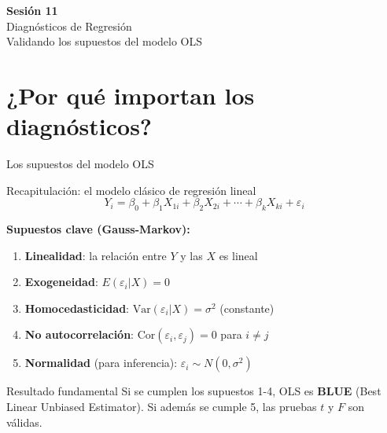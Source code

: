 \documentclass[aspectratio=169, 11pt]{beamer}
\begin{document}
\begin{frame}{}
\vfill
\centering
{\Large\textbf{Sesi\'on 11}}\\[1em]
{\normalsize Diagn\'osticos de Regresi\'on}\\[0.5em]
{\small Validando los supuestos del modelo OLS}
\vfill
\end{frame}

\section{¿Por qué importan los diagnósticos?}

\begin{frame}{Los supuestos del modelo OLS}
\begin{block}{Recapitulación: el modelo clásico de regresión lineal}
$$Y_i = \beta_0 + \beta_1 X_{1i} + \beta_2 X_{2i} + \cdots + \beta_k X_{ki} + \varepsilon_i$$
\end{block}

\textbf{Supuestos clave (Gauss-Markov):}
\begin{enumerate}
\item \textbf{Linealidad}: la relación entre $Y$ y las $X$ es lineal
\item \textbf{Exogeneidad}: $E(\varepsilon_i | X) = 0$
\item \textbf{Homocedasticidad}: $\text{Var}(\varepsilon_i | X) = \sigma^2$ (constante)
\item \textbf{No autocorrelación}: $\text{Cor}(\varepsilon_i, \varepsilon_j) = 0$ para $i \neq j$
\item \textbf{Normalidad} (para inferencia): $\varepsilon_i \sim N(0, \sigma^2)$
\end{enumerate}

\vspace{0.3cm}
\begin{alertblock}{Resultado fundamental}
Si se cumplen los supuestos 1-4, OLS es \textbf{BLUE} (Best Linear Unbiased Estimator).
Si además se cumple 5, las pruebas $t$ y $F$ son válidas.
\end{alertblock}
\end{frame}
\end{document}
